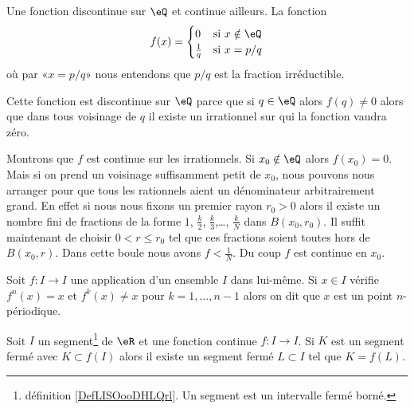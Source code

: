 \begin{example}
    Une fonction discontinue sur \( \eQ\) et continue ailleurs. La fonction 
    \begin{equation}
        f(x)=\begin{cases}
            0    &   \text{si \( x\notin \eQ\)}\\
            \frac{1}{ q }    &    \text{si \( x=p/q\)}
        \end{cases}
    \end{equation}
    où par «\( x=p/q\)» nous entendons que \( p/q\) est la fraction irréductible.

    Cette fonction est discontinue sur \( \eQ\) parce que si \( q\in \eQ\) alors \( f(q)\neq 0\) alors que dans tous voisinage de \( q\) il existe un irrationnel sur qui la fonction vaudra zéro.

    Montrons que \( f\) est continue sur les irrationnels. Si \( x_0\notin \eQ\) alors \( f(x_0)=0\). Mais si on prend un voisinage suffisamment petit de \( x_0\), nous pouvons nous arranger pour que tous les rationnels aient un dénominateur arbitrairement grand. En effet si nous nous fixons un premier rayon \( r_0>0\) alors il existe un nombre fini de fractions de la forme \( 1\), \( \frac{ k }{2}\), \( \frac{ k }{ 3 }\),\ldots, \( \frac{ k }{ N }\) dans \( B(x_0,r_0)\). Il suffit maintenant de choisir \( 0<r\leq r_0\) tel que ces fractions soient toutes hors de \( B(x_0,r)\). Dans cette boule nous avons \( f<\frac{1}{ N }\). Du coup \( f\) est continue en \( x_0\).
\end{example}

\begin{definition}
    Soit \( f\colon I\to I\) une application d'un ensemble \( I\) dans lui-même. Si \( x\in I\) vérifie \( f^n(x)=x\) et \( f^k(x)\neq x\) pour \( k=1,\ldots, n-1\) alors on dit que \( x\) est un point \( n\)-périodique.
\end{definition}

\begin{lemma}       \label{LemAONBooGZBuYt}
    Soit \( I\) un segment\footnote{définition \ref{DefLISOooDHLQrl}. Un segment est un intervalle fermé borné.} de \( \eR\) et une fonction continue \( f\colon I\to I\). Si \( K\) est un segment fermé avec \( K\subset f(I)\) alors il existe un segment fermé \( L\subset I\) tel que \( K=f(L)\).
\end{lemma}

